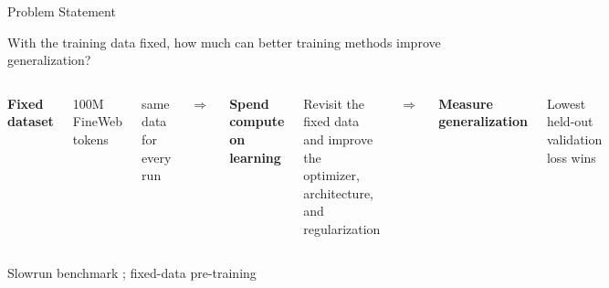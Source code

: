 \documentclass[aspectratio=169,11pt]{beamer}
\newcommand{\smallcite}[1]{\hfill{\tiny\color{gray}#1}}
\begin{document}
\begin{frame}{Problem Statement}
  \begin{center}
    \large
    \textcolor{hhublue}{With the training data fixed, how much can better training
    methods improve generalization?}
  \end{center}

  \vfill
  \begin{columns}[c,onlytextwidth]
      \centering
      \textbf{Fixed dataset}\par
      \vspace{0.15cm}
      100M FineWeb tokens\par
      same data for every run

      \centering
      {\Large\color{hhublue}$\Longrightarrow$}

      \centering
      \textbf{Spend compute on learning}\par
      \vspace{0.15cm}
      Revisit the fixed data and improve the optimizer, architecture, and regularization

      \centering
      {\Large\color{hhublue}$\Longrightarrow$}

      \centering
      \textbf{Measure generalization}\par
      \vspace{0.15cm}
      Lowest held-out validation loss wins
  \end{columns}

  \vfill
  \smallcite{Slowrun benchmark \cite{slowrun2026}; fixed-data pre-training \cite{kim2025infinite}}
\end{frame}
\end{document}
